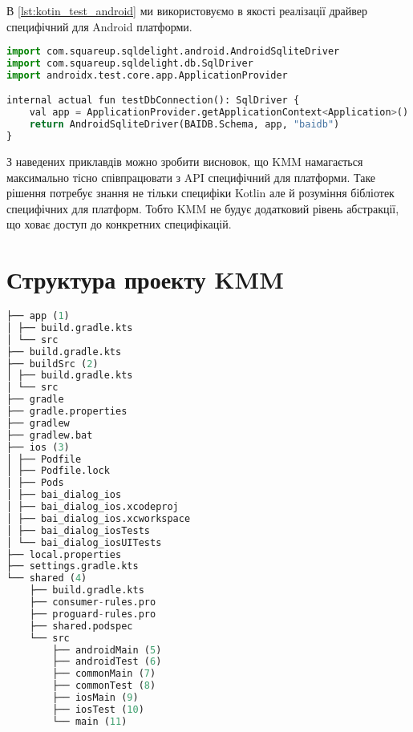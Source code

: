 В \ref{lst:kotin_test_android} ми використовуємо в якості реалізації драйвер специфічний для Android платформи.

\begin{lstlisting}[style=light, language=Python,label={lst:kotin_test_android},caption=Android SQLDriver]
import com.squareup.sqldelight.android.AndroidSqliteDriver
import com.squareup.sqldelight.db.SqlDriver
import androidx.test.core.app.ApplicationProvider

internal actual fun testDbConnection(): SqlDriver {
    val app = ApplicationProvider.getApplicationContext<Application>()
    return AndroidSqliteDriver(BAIDB.Schema, app, "baidb")
}
\end{lstlisting}

З наведених приклавдів можно зробити висновок, що KMM намагається максимально тісно співпрацювати з API специфічний для платформи.
Таке рішення потребує знання не тільки специфіки Kotlin але й розуміння бібліотек специфічних для платформ.
Тобто KMM не будує додатковий рівень абстракції, що ховає доступ до конкретних специфікацій.


\section{Структура проекту KMM}
\label{section.2.13}

\begin{lstlisting}[style=light, language=Python,label={lst:kmm_project_layout},caption=KMM Project Layout]
├── app (1)
│ ├── build.gradle.kts
│ └── src
├── build.gradle.kts
├── buildSrc (2)
│ ├── build.gradle.kts
│ └── src
├── gradle
├── gradle.properties
├── gradlew
├── gradlew.bat
├── ios (3)
│ ├── Podfile
│ ├── Podfile.lock
│ ├── Pods
│ ├── bai_dialog_ios
│ ├── bai_dialog_ios.xcodeproj
│ ├── bai_dialog_ios.xcworkspace
│ ├── bai_dialog_iosTests
│ └── bai_dialog_iosUITests
├── local.properties
├── settings.gradle.kts
└── shared (4)
    ├── build.gradle.kts
    ├── consumer-rules.pro
    ├── proguard-rules.pro
    ├── shared.podspec
    └── src
        ├── androidMain (5)
        ├── androidTest (6)
        ├── commonMain (7)
        ├── commonTest (8)
        ├── iosMain (9)
        ├── iosTest (10)
        └── main (11)
\end{lstlisting}


